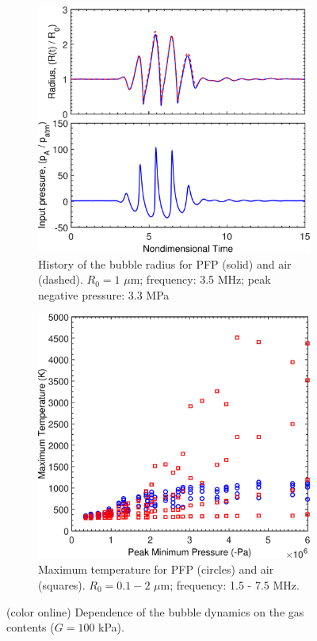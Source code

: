 \begin{figure}[t]
  \begin{subfigure}[b]{0.47\textwidth}
  \includegraphics[width=\textwidth]{./figs/bubble_figs/pfpair}
  \caption{History of the bubble radius for PFP (solid) and air
    (dashed). $R_0=1$ $\mu$m; frequency: 3.5 MHz; peak negative
    pressure: 3.3 MPa}
\end{subfigure}
  \begin{subfigure}[b]{0.47\textwidth}
    \includegraphics[width=\textwidth]{./figs/bubble_figs/tmaxpfpair} 
    \caption{Maximum temperature for PFP (circles) and air (squares). $R_0=0.1-2$ $\mu$m; frequency: 1.5 - 7.5 MHz.}
  \end{subfigure}
  \caption{(color online) Dependence of the bubble dynamics on the gas contents ($G=100$ kPa).}
  \label{figure:gascontents}
\end{figure}

